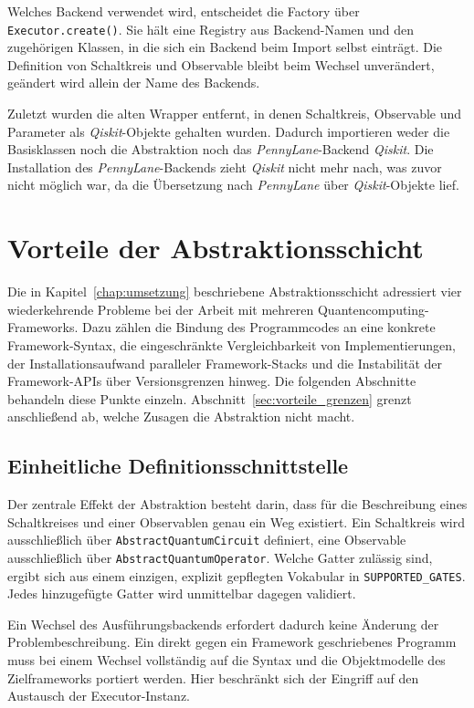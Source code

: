 Welches Backend verwendet wird, entscheidet die Factory über \texttt{Executor.create()}. Sie
hält eine Registry aus Backend-Namen und den zugehörigen Klassen, in die sich ein Backend
beim Import selbst einträgt. Die Definition von Schaltkreis und Observable bleibt beim
Wechsel unverändert, geändert wird allein der Name des Backends.

Zuletzt wurden die alten Wrapper entfernt, in denen Schaltkreis, Observable und Parameter als
\textit{Qiskit}-Objekte gehalten wurden. Dadurch importieren weder die Basisklassen noch die
Abstraktion noch das \textit{PennyLane}-Backend \textit{Qiskit}. Die Installation des
\textit{PennyLane}-Backends zieht \textit{Qiskit} nicht mehr nach, was zuvor nicht möglich
war, da die Übersetzung nach \textit{PennyLane} über \textit{Qiskit}-Objekte lief.

\chapter{Vorteile der Abstraktionsschicht}
\label{chap:vorteile}

Die in Kapitel~\ref{chap:umsetzung} beschriebene Abstraktionsschicht adressiert
vier wiederkehrende Probleme bei der Arbeit mit mehreren
Quantencomputing-Frameworks. Dazu zählen die Bindung des Programmcodes an eine
konkrete Framework-Syntax, die eingeschränkte Vergleichbarkeit von
Implementierungen, der Installationsaufwand paralleler Framework-Stacks und die
Instabilität der Framework-APIs über Versionsgrenzen hinweg. Die folgenden
Abschnitte behandeln diese Punkte einzeln. Abschnitt~\ref{sec:vorteile_grenzen}
grenzt anschließend ab, welche Zusagen die Abstraktion nicht macht.

\section{Einheitliche Definitionsschnittstelle}
\label{sec:vorteile_einheitlich}

Der zentrale Effekt der Abstraktion besteht darin, dass für die Beschreibung
eines Schaltkreises und einer Observablen genau ein Weg existiert. Ein
Schaltkreis wird ausschließlich über \texttt{AbstractQuantumCircuit} definiert,
eine Observable ausschließlich über \texttt{AbstractQuantumOperator}. Welche
Gatter zulässig sind, ergibt sich aus einem einzigen, explizit gepflegten
Vokabular in \texttt{SUPPORTED\_GATES}. Jedes hinzugefügte Gatter wird
unmittelbar dagegen validiert.

Ein Wechsel des Ausführungsbackends erfordert dadurch keine Änderung der
Problembeschreibung. Ein direkt gegen ein Framework geschriebenes Programm muss
bei einem Wechsel vollständig auf die Syntax und die Objektmodelle des
Zielframeworks portiert werden. Hier beschränkt sich der Eingriff auf den
Austausch der Executor-Instanz.

